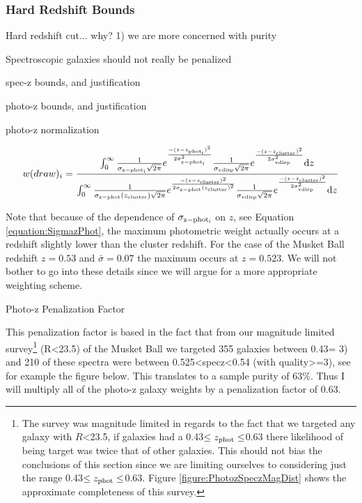 \subsubsection{Hard Redshift Bounds}
Hard redshift cut... why? 1) we are more concerned with purity 

Spectroscopic galaxies should not really be penalized 


spec-z bounds, and justification

photo-z bounds, and justification

photo-z normalization

\begin{equation}
w(draw)_i = \frac{\int_{0}^{\infty} \frac{1}{\sigma_{\rm z-phot_{i}}\sqrt{2\pi}}e^{\frac{-(z-z_{\rm phot_{i}})^2}{2\sigma_{\rm z-phot_{i}}^2}} \frac{1}{\sigma_{\rm vdisp}\sqrt{2\pi}}e^{\frac{-(z-z_{\rm cluster})^2}{2\sigma_{\rm vdisp}^2}}\mathrm{d}z}{\int_{0}^{\infty} \frac{1}{\sigma_{\rm z-phot}(z_{\rm cluster})\sqrt{2\pi}}e^{\frac{-(z-z_{\rm cluster})^2}{2\sigma_{\rm z-phot}(z_{\rm cluster})^2}}\frac{1}{\sigma_{\rm vdisp}\sqrt{2\pi}}e^{\frac{-(z-z_{\rm cluster})^2}{2\sigma_{\rm vdisp}^2}}\mathrm{d}z}
\label{equation:NormalizedPhotozWeight}
\end{equation}

Note that because of the dependence of $\sigma_{\rm z-phot_{i}}$ on $z$, see Equation \ref{equation:SigmazPhot}, the maximum photometric weight actually occurs at a redshift slightly lower than the cluster redshift. For the case of the Musket Ball redshift $z=0.53$ and $\bar{\sigma}=0.07$ the maximum occurs at $z=0.523$. We will not bother to go into these details since we will argue for a more appropriate weighting scheme.

Photo-z Penalization Factor

This penalization factor is based in the fact that from our magnitude limited survey\footnote{The survey was magnitude limited in regards to the fact that we targeted any galaxy with $R$<23.5, if galaxies had a 0.43$\leq z_{\rm phot} \leq$0.63 there likelihood of being target was twice that of other galaxies. This should not bias the conclusions of this section since we are limiting ourselves to considering just the range 0.43$\leq z_{\rm phot} \leq$0.63. Figure \ref{figure:PhotozSpeczMagDist} shows the approximate completeness of this survey.} (R<23.5) of the Musket Ball we targeted 355 galaxies between 0.43= 3) and 210 of these spectra were between 0.525<specz<0.54 (with quality>=3), see for example the figure below. This translates to a sample purity of 63\%.  Thus I will multiply all of the photo-z galaxy weights by a penalization factor of 0.63.


